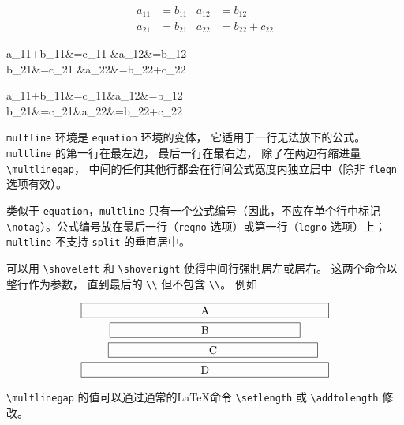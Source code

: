 \begin{listing}
\begin{align}
a_{11}&=b_{11}&a_{12}&=b_{12}\\
a_{21}&=b_{21}&a_{22}&=b_{22}+c_{22}
\end{align}

\end{listing}



\begin{listing}
\begin{flalign*}
a_{11}+b_{11}&=c_{11}
&a_{12}&=b_{12}\\
b_{21}&=c_{21}
&a_{22}&=b_{22}+c_{22}
\end{flalign*}

\end{listing}

\begin{listing}
\begin{flalign}
a_{11}+b_{11}&=c_{11}&a_{12}&=b_{12}\\
b_{21}&=c_{21}&a_{22}&=b_{22}+c_{22}
\end{flalign}
\end{listing}

\verb|multline| 环境是 \verb|equation| 环境的变体，  它适用于一行无法放下的公式。  \verb|multline| 的第一行在最左边，  最后一行在最右边，  除了在两边有缩进量 \verb|\multlinegap|，  中间的任何其他行都会在行间公式宽度内独立居中（除非 \verb|fleqn| 选项有效）。

类似于 \verb|equation|，\verb|multline| 只有一个公式编号（因此，不应在单个行中标记 \verb|\notag|）。公式编号放在最后一行（\verb|reqno| 选项）或第一行（\verb|legno| 选项）上；\verb|multline| 不支持 \verb|split| 的垂直居中。

可以用 \verb|\shoveleft| 和 \verb|\shoveright| 使得中间行强制居左或居右。 这两个命令以整行作为参数，  直到最后的 \verb|\\| 但不包含 \verb|\\|。 例如
\begin{tcblisting}{}
\begin{multline}
\framebox[.65\columnwidth]{A}\\
\framebox[.5\columnwidth]{B}\\
\shoveright{\framebox[.55\columnwidth]{C}}\\
\framebox[.65\columnwidth]{D}
\end{multline}
\end{tcblisting}

\verb|\multlinegap| 的值可以通过通常的\LaTeX 命令 \verb|\setlength| 或 \verb|\addtolength| 修改。

